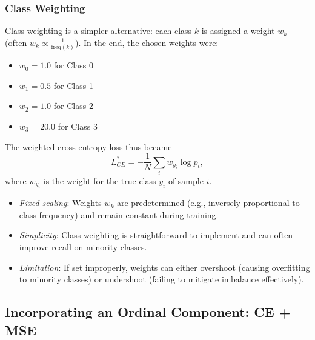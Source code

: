 \subsubsection{Class Weighting}
Class weighting is a simpler alternative: each class $k$ is assigned a weight $w_k$ (often $w_k \propto \frac{1}{\text{freq}(k)}$). In the end, the chosen weights were:
\begin{itemize}
  \item $w_{0}=1.0$ for \ac{Class 0}
  \item $w_{1}=0.5$ for \ac{Class 1}
  \item $w_{2}=1.0$ for \ac{Class 2}
  \item $w_{3}=20.0$ for \ac{Class 3}
\end{itemize}

The weighted cross-entropy loss thus became 
\begin{equation}
  L_{CE}^{*} = -\frac{1}{N}\sum_i w_{y_i}\log p_t,
\end{equation}
where $w_{y_i}$ is the weight for the true class $y_i$ of sample $i$. 

\begin{itemize}
    \item \textit{Fixed scaling}: Weights $w_k$ are predetermined (e.g., inversely proportional to class frequency) and remain constant during training.
    \item \textit{Simplicity}: Class weighting is straightforward to implement and can often improve recall on minority classes.
    \item \textit{Limitation}: If set improperly, weights can either overshoot (causing overfitting to minority classes) or undershoot (failing to mitigate imbalance effectively).
\end{itemize}

\subsection{Incorporating an Ordinal Component: CE + MSE}\label{sec:ordinal_mse}

